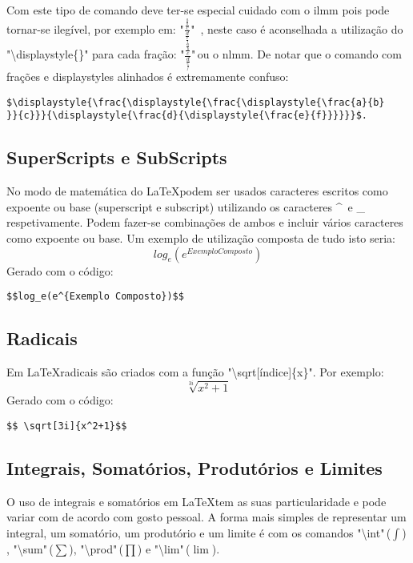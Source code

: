 Com este tipo de comando deve ter-se especial cuidado com o \ac{ilmm} pois pode tornar-se ilegível, por exemplo em: "$\frac{\frac{\frac{a}{b}}{c}}{\frac{d}{\frac{e}{f}}}$"  \,, neste caso é aconselhada a utilização do "\textbackslash displaystyle\{\}" para cada fração: "$\displaystyle{\frac{\displaystyle{\frac{\displaystyle{\frac{a}{b}}}
{c}}}{\displaystyle{\frac{d}{\displaystyle{\frac{e}{f}}}}}}$"\,ou o \ac{nlmm}. De notar que o comando com frações e displaystyles alinhados é extremamente confuso:
\begin{verbatim}$\displaystyle{\frac{\displaystyle{\frac{\displaystyle{\frac{a}{b}
}}{c}}}{\displaystyle{\frac{d}{\displaystyle{\frac{e}{f}}}}}}$.
\end{verbatim}

\subsection{SuperScripts e SubScripts}
No modo de matemática do \LaTeX podem ser usados caracteres escritos como expoente ou base (superscript e subscript) utilizando os caracteres \textasciicircum \, e \_ respetivamente.
Podem fazer-se combinações de ambos e incluir vários caracteres como expoente ou base. Um exemplo de utilização composta de tudo isto seria:
$$log_e(e^{Exemplo Composto})$$
Gerado com o código:
\begin{verbatim}$$log_e(e^{Exemplo Composto})$$
\end{verbatim}

\subsection{Radicais}
Em \LaTeX radicais são criados com a função "\textbackslash sqrt[índice]\{x\}".
Por exemplo: $$ \sqrt[3i]{x^2+1}$$
Gerado com o código:
\begin{verbatim}$$ \sqrt[3i]{x^2+1}$$
\end{verbatim}

\subsection{Integrais, Somatórios, Produtórios e Limites}
\label{subchap.integrais}
O uso de integrais e somatórios em \LaTeX tem as suas particularidade e pode variar com de acordo com gosto pessoal. A forma mais simples de representar um integral, um somatório, um produtório e um limite é com os comandos "\textbackslash int"\,($\int$) , "\textbackslash sum"\,($\sum$), "\textbackslash prod"\,($\prod$) e "\textbackslash lim"\,($\lim$).

